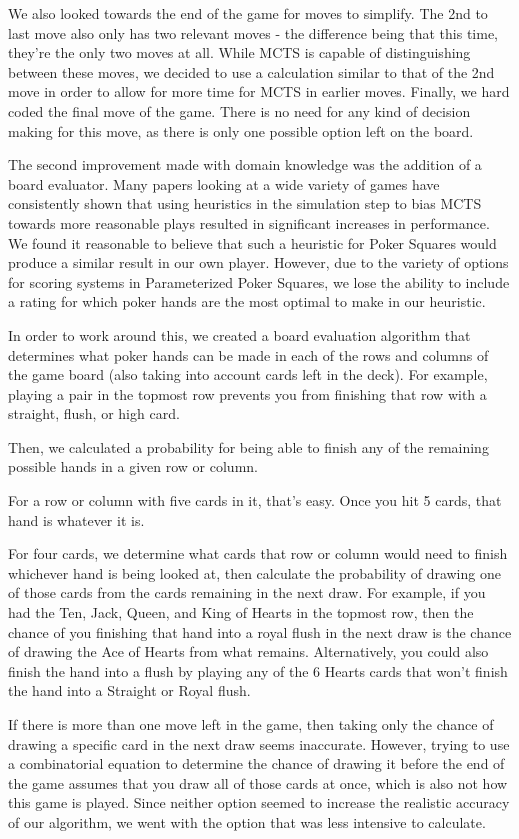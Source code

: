 \documentclass[letterpaper]{article}
\begin{document}
We also looked towards the end of the game for moves to simplify. The 2nd to last move also only has two relevant moves - the difference being that this time, they’re the only two moves at all. While MCTS is capable of distinguishing between these moves, we decided to use a calculation similar to that of the 2nd move in order to allow for more time for MCTS in earlier moves.
Finally, we hard coded the final move of the game. There is no need for any kind of decision making for this move, as there is only one possible option left on the board.

The second improvement made with domain knowledge was the addition of a board evaluator. Many papers looking at a wide variety of games have consistently shown that using heuristics in the simulation step to bias MCTS towards more reasonable plays resulted in significant increases in performance. We found it reasonable to believe that such a heuristic for Poker Squares would produce a similar result in our own player. However, due to the variety of options for scoring systems in Parameterized Poker Squares, we lose the ability to include a rating for which poker hands are the most optimal to make in our heuristic.

In order to work around this, we created a board evaluation algorithm that determines what poker hands can be made in each of the rows and columns of the game board (also taking into account cards left in the deck). For example, playing a pair in the topmost row prevents you from finishing that row with a straight, flush, or high card.

Then, we calculated a probability for being able to finish any of the remaining possible hands in a given row or column. 

For a row or column with five cards in it, that’s easy. Once you hit 5 cards, that hand is whatever it is.

For four cards, we determine what cards that row or column would need to finish whichever hand is being looked at, then calculate the probability of drawing one of those cards from the cards remaining in the next draw. For example, if you had the Ten, Jack, Queen, and King of Hearts in the topmost row, then the chance of you finishing that hand into a royal flush in the next draw is the chance of drawing the Ace of Hearts from what remains. Alternatively, you could also finish the hand into a flush by playing any of the 6 Hearts cards that won’t finish the hand into a Straight or Royal flush.

If there is more than one move left in the game, then taking only the chance of drawing a specific card in the next draw seems inaccurate. However, trying to use a combinatorial equation to determine the chance of drawing it before the end of the game assumes that you draw all of those cards at once, which is also not how this game is played. Since neither option seemed to increase the realistic accuracy of our algorithm, we went with the option that was less intensive to calculate.
\end{document}

